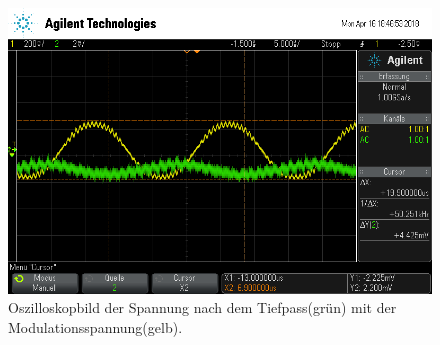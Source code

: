 \begin{figure}[h]
  \centering
  \includegraphics[width=.9\textwidth]{Oszi_Pics/hnachTiefpass.png}
  \caption{Oszilloskopbild der Spannung nach dem Tiefpass(grün) mit der Modulationsspannung(gelb).}
  \label{fig:hnachTiefpass}
\end{figure}
